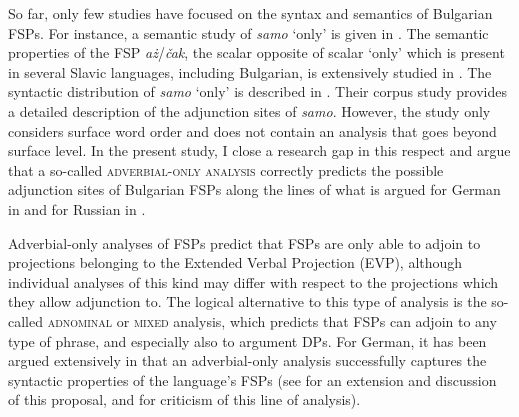 \documentclass[output=paper,colorlinks,citecolor=brown]{langscibook}
\begin{document}
\noindent So far, only few studies have focused on the syntax and semantics of Bulgarian FSPs. For instance, a semantic study of \textit{samo} `only’ is given in \citet{Nicolova2000}. The semantic properties of the FSP \textit{a\.z}/\textit{\v cak}, the scalar opposite of scalar `only' which is present in several Slavic languages, including Bulgarian, is extensively studied in \citet{Tomaszewicz2013}. The syntactic distribution of \textit{samo} `only’ is described in \citet{TishevaDzhonova2003}. Their corpus study provides a detailed description of the adjunction sites of \textit{samo}. However, the study only considers surface word order and does not contain an analysis that goes beyond surface level. In the present study, I close a research gap in this respect and argue that a so-called \textsc{adverbial-only analysis} correctly predicts the possible adjunction sites of Bulgarian FSPs along the lines of what is argued for German in \citet{BuringHartmann2001} and for Russian in \citet{Zanon2018}. \par 
Adverbial-only analyses of FSPs predict that FSPs are only able to adjoin to projections belonging to the Extended Verbal Projection (EVP), although individual analyses of this kind may differ with respect to the projections which they allow adjunction to. The logical alternative to this type of analysis is the so-called \textsc{adnominal} or \textsc{mixed} analysis, which predicts that FSPs can adjoin to any type of phrase, and especially also to argument DPs. For German, it has been argued extensively in \citet{BuringHartmann2001} that an adverbial-only analysis successfully captures the syntactic properties of the language's FSPs (see \citealt{Mursell2021} for an extension and discussion of this proposal, and \citealt{Sudhoff2010} for criticism of this line of analysis). 
\end{document}
